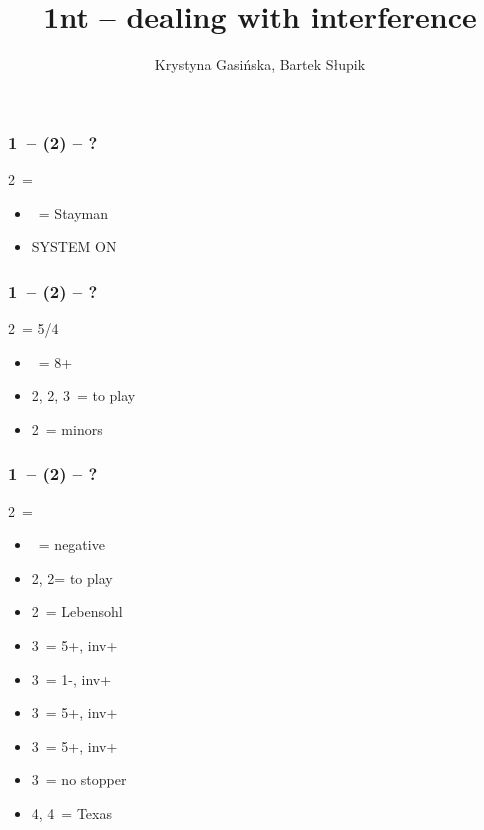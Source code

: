 \documentclass[12pt, a4paper]{article}
\title{1nt -- dealing with interference}
\author{Krystyna Gasińska, Bartek Słupik}
\begin{document}
\maketitle


\subsubsection*{1\nt\ -- (2\clubs) -- ?}
2\clubs\ = \clubs
\begin{itemize}
    \item \dbl\ = Stayman
    \item SYSTEM ON
\end{itemize}

\subsubsection*{1\nt\ -- (2\clubs\alrts) -- ?}
2\clubs\ = 5/4 \major
\begin{itemize}
    \item \dbl\ = 8+
    \item 2\hearts, 2\spades, 3\clubs\ = to play
    \item 2\nt\ = minors
\end{itemize}

\subsubsection*{1\nt\ -- (2\diams) -- ?}
2\clubs\ = \diams
\begin{itemize}
    \item \dbl\ = negative
    \item 2\hearts, 2\spades = to play
    \item 2\nt\ = Lebensohl
    \item 3\clubs\ = 5+\hearts, inv+
    \item 3\diams\ = 1-\diams, inv+
    \item 3\hearts\ = 5+\spades, inv+
    \item 3\spades\ = 5+\clubs, inv+
    \item 3\nt\ = no \diams stopper
    \item 4\diams, 4\hearts\ = Texas
\end{itemize}
\end{document}

